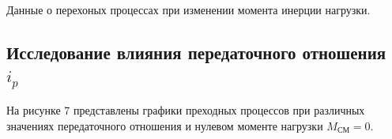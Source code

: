 \documentclass[a4paper, 12pt]{article}
\begin{document}
\begin{table}[h!]
    \centering
    \begin{threeparttable}
        \caption{Данные о перехоных процессах при изменении момента инерции нагрузки.}
    \end{threeparttable}
\end{table}

\newpage
\begin{center}
\section{Исследование влияния передаточного отношения $i_p$}
\end{center} \par
На рисунке 7 представлены графики преходных процессов при различных значениях передаточного отношения и нулевом моменте нагрузки $M_\text{СМ} = 0$.
\end{document}
